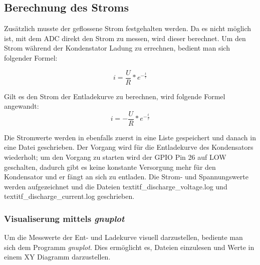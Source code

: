 \documentclass{article}
\begin{document}
\subsection{Berechnung des Stroms}
Zusätzlich musste der geflossene Strom festgehalten werden. Da es nicht möglich ist, mit dem ADC direkt den Strom zu messen, wird dieser berechnet.
Um den Strom während der Kondenstator Ladung zu errechnen, bedient man sich folgender Formel:

\begin{equation}
    i=\frac{U}{R} * e^{-\frac{t}{\tau}}
\end{equation}

Gilt es den Strom der Entladekurve zu berechnen, wird folgende Formel angewandt:
\begin{equation}
    i=-\frac{U}{R} * e^{-\frac{t}{\tau}}
\end{equation}

Die Stromwerte werden in ebenfalls zuerst in eine Liste gespeichert und danach in eine Datei geschrieben.
Der Vorgang wird für die Entladekurve des Kondensators wiederholt; um den Vorgang zu starten wird der GPIO Pin 26 auf LOW geschalten, 
dadurch gibt es keine konstante Versorgung mehr für den Kondensator und er fängt an sich zu entladen.
Die Strom- und Spannungswerte werden aufgezeichnet und die Dateien textit{f\_discharge\_voltage.log} und textit{f\_discharge\_current.log} geschrieben.

\subsubsection{Visualiserung mittels \textit{gnuplot}}
Um die Messwerte der Ent- und Ladekurve visuell darzustellen, bediente man sich dem Programm \textit{gnuplot}. 
Dies ermöglicht es, Dateien einzulesen und Werte in einem XY Diagramm darzustellen. \\
\end{document}
